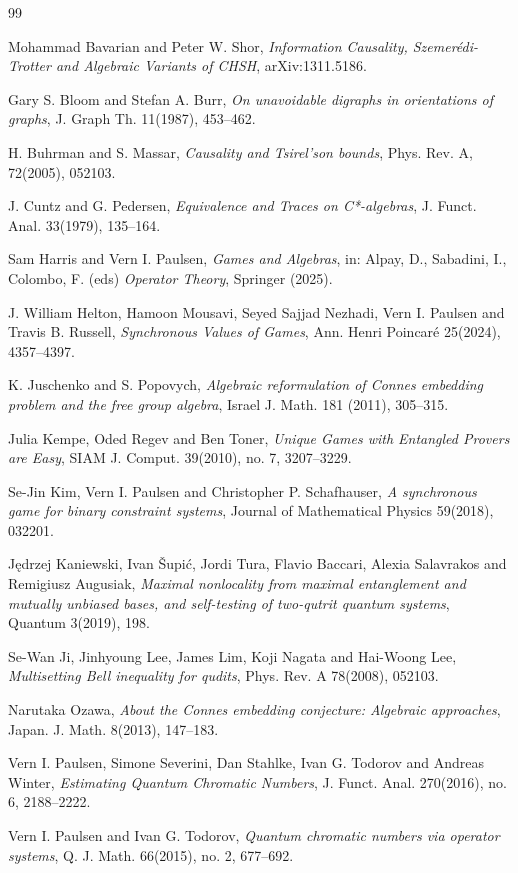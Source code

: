\documentclass[11pt]{amsart}
\theoremstyle{definition}
\begin{document}
\begin{thebibliography}{99}

   Mohammad Bavarian and  Peter W. Shor, {\it Information Causality, Szemerédi-Trotter and Algebraic Variants of CHSH}, arXiv:1311.5186.

  Gary S. Bloom and Stefan A. Burr, {\it On unavoidable digraphs in orientations of graphs}, J. Graph Th. 11(1987), 453--462.

 H. Buhrman and S. Massar, {\it Causality and Tsirel’son bounds}, Phys. Rev. A, 72(2005),
052103.

 J. Cuntz and G. Pedersen, {\it Equivalence and Traces on C*-algebras}, J. Funct. Anal. 33(1979), 135--164.

 Sam Harris and Vern I. Paulsen, {\it Games and Algebras}, in: Alpay, D., Sabadini, I., Colombo, F. (eds) {\it Operator Theory}, Springer (2025).

  J. William Helton, Hamoon Mousavi, Seyed Sajjad Nezhadi, Vern I. Paulsen and  Travis B. Russell, {\it Synchronous Values of Games}, Ann. Henri Poincaré 25(2024), 4357--4397. %
  
  K. Juschenko and S. Popovych, {\it Algebraic reformulation of Connes embedding problem and the free
group algebra}, Israel J. Math. 181 (2011), 305–315.

 Julia Kempe, Oded Regev and Ben Toner, {\it Unique
    Games with Entangled Provers are Easy}, SIAM J. Comput. 39(2010),
  no. 7, 3207--3229.

 Se-Jin Kim, Vern I. Paulsen and Christopher P. Schafhauser, {\it A synchronous game for binary constraint systems}, Journal of Mathematical Physics 59(2018), 032201.

  Jędrzej Kaniewski, Ivan Šupić, Jordi Tura, Flavio Baccari, Alexia Salavrakos and Remigiusz Augusiak,
  {\it Maximal nonlocality from maximal entanglement and mutually unbiased bases, and self-testing of two-qutrit quantum systems}, Quantum 3(2019), 198.

 Se-Wan Ji, Jinhyoung Lee, James Lim, Koji Nagata and Hai-Woong Lee, {\it Multisetting Bell inequality for qudits}, Phys. Rev. A 78(2008), 052103.

 Narutaka Ozawa, {\it About the Connes embedding conjecture: Algebraic approaches}, Japan. J. Math. 8(2013), 147--183.

 Vern I. Paulsen, Simone Severini, Dan Stahlke, Ivan G. Todorov and Andreas Winter, {\it Estimating Quantum Chromatic Numbers},
  J. Funct. Anal. 270(2016), no. 6, 2188--2222.

 Vern I. Paulsen and Ivan G. Todorov, {\it Quantum chromatic numbers via operator systems}, Q. J. Math. 66(2015), no. 2, 677--692.

\end{thebibliography}
\end{document}
